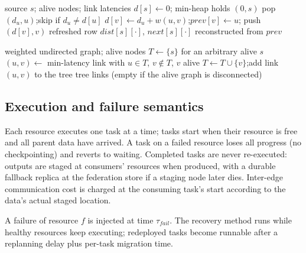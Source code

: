 \documentclass[conference]{IEEEtran}
\theoremstyle{remark}
\begin{document}
\begin{algorithm}
\caption{SSSP -- Dijkstra row repair (per stale source)}
\label{alg:sssp}
\begin{algorithmic}[1]
\REQUIRE source $s$; alive nodes; link latencies
\STATE $d[s] \gets 0$; min-heap holds $(0, s)$
  \STATE pop $(d_u, u)$;\quad skip if $d_u \neq d[u]$
      \STATE $d[v] \gets d_u + w(u,v)$;\quad $\mathit{prev}[v] \gets u$;\quad
             push $(d[v], v)$
    \ENDIF
  \ENDFOR
\ENDWHILE
\RETURN refreshed row $\mathit{dist}[s][\cdot]$, $\mathit{next}[s][\cdot]$
        reconstructed from $\mathit{prev}$
\end{algorithmic}
\end{algorithm}

\begin{algorithm}
\caption{MST -- Prim (replacement-region selection)}
\label{alg:mst}
\begin{algorithmic}[1]
\REQUIRE weighted undirected graph; alive nodes
\STATE $T \gets \{s\}$ for an arbitrary alive $s$
  \STATE $(u,v) \gets$ min-latency link with $u \in T$, $v \notin T$,
         $v$ alive
  \STATE $T \gets T \cup \{v\}$;\quad add link $(u,v)$ to the tree
\ENDWHILE
\RETURN tree links (empty if the alive graph is disconnected)
\end{algorithmic}
\end{algorithm}

\subsection{Execution and failure semantics}

Each resource executes one task at a time; tasks start when their resource is
free and all parent data have arrived. A task on a failed resource loses all
progress (no checkpointing) and reverts to waiting. Completed tasks are never
re-executed: outputs are staged at consumers' resources when produced, with a
durable fallback replica at the federation store if a staging node later
dies. Inter-edge communication cost is charged at the consuming task's start
according to the data's actual staged location.

A failure of resource $f$ is injected at time $\tau_{fail}$. The recovery
method runs while healthy resources keep executing; redeployed tasks become
runnable after a replanning delay plus per-task migration time.
\end{document}

